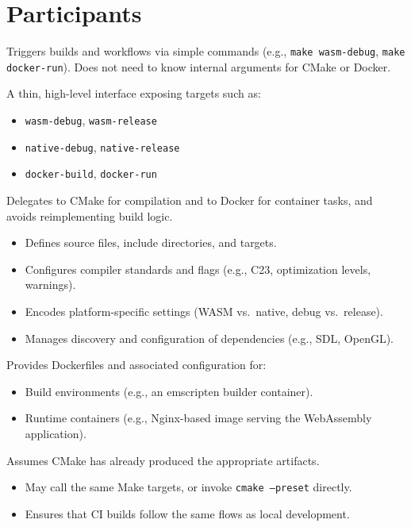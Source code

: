 \documentclass[11pt]{article}
\begin{document}
\section{Participants}

\begin{description}[style=nextline]
  \item[Developer]
    Triggers builds and workflows via simple commands (e.g., \texttt{make wasm-debug}, \texttt{make docker-run}). Does not need to know internal arguments for CMake or Docker.

  \item[BuildFacade (Makefile)]
    A thin, high-level interface exposing targets such as:
    \begin{itemize}[noitemsep]
      \item \texttt{wasm-debug}, \texttt{wasm-release}
      \item \texttt{native-debug}, \texttt{native-release}
      \item \texttt{docker-build}, \texttt{docker-run}
    \end{itemize}
    Delegates to CMake for compilation and to Docker for container tasks, and avoids reimplementing build logic.

  \item[CoreBuilder (CMake configuration)]
    \begin{itemize}[noitemsep]
      \item Defines source files, include directories, and targets.
      \item Configures compiler standards and flags (e.g., C23, optimization levels, warnings).
      \item Encodes platform-specific settings (WASM vs.\ native, debug vs.\ release).
      \item Manages discovery and configuration of dependencies (e.g., SDL, OpenGL).
    \end{itemize}

  \item[ContainerRuntime (Docker configuration)]
    Provides Dockerfiles and associated configuration for:
    \begin{itemize}[noitemsep]
      \item Build environments (e.g., an emscripten builder container).
      \item Runtime containers (e.g., Nginx-based image serving the WebAssembly application).
    \end{itemize}
    Assumes CMake has already produced the appropriate artifacts.

  \item[CI/CD System]
    \begin{itemize}[noitemsep]
      \item May call the same Make targets, or invoke \texttt{cmake --preset} directly.
      \item Ensures that CI builds follow the same flows as local development.
    \end{itemize}
\end{description}
\end{document}
